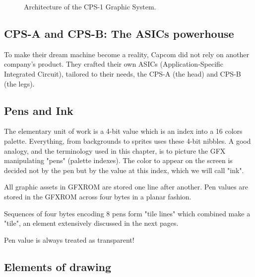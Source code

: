 \begin{figure}[H]
\caption*{Architecture of the CPS-1 Graphic System.}
\end{figure}


\subsection{CPS-A and CPS-B: The ASICs powerhouse}
To make their dream machine become a reality, Capcom did not rely on another company's product. They crafted their own ASICs (Application-Specific Integrated Circuit), tailored to their needs, the CPS-A (the head) and CPS-B (the legs).








\subsection{Pens and Ink}
The elementary unit of work is a 4-bit value which is an index into a 16 colors palette. Everything, from backgrounds to sprites uses these 4-bit nibbles. A good analogy, and the terminology used in this chapter, is to picture the GFX manipulating "pens" (palette indexes). The color to appear on the screen is decided not by the pen but by the value at this index, which we will call "ink".


All graphic assets in GFXROM are stored one line after another. Pen values are stored in the GFXROM across four bytes in a planar fashion.






Sequences of four bytes encoding 8 pens form "tile lines" which combined make a "tile", an element extensively discussed in the next pages.

 \begin{trivia}
 Pen value  is always treated as transparent!
 \end{trivia}



\subsection{Elements of drawing}


